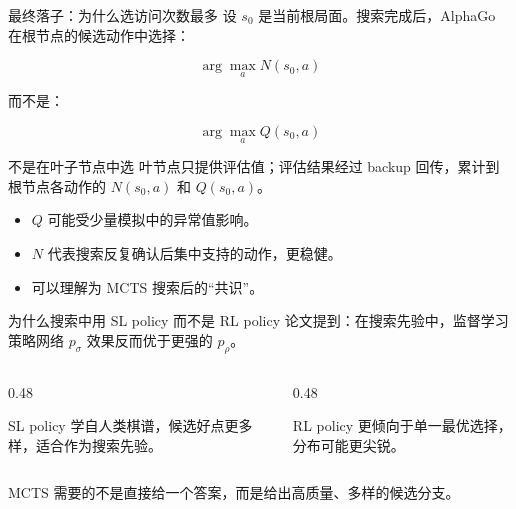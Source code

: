 \documentclass[UTF8,aspectratio=169,10pt]{ctexbeamer}
\begin{document}
\begin{frame}{最终落子：为什么选访问次数最多}
  设 $s_0$ 是当前根局面。搜索完成后，AlphaGo 在根节点的候选动作中选择：

  \[
    \arg\max_a N(s_0,a)
  \]

  而不是：

  \[
    \arg\max_a Q(s_0,a)
  \]

  \begin{block}{不是在叶子节点中选}
    叶节点只提供评估值；评估结果经过 backup 回传，累计到根节点各动作的 $N(s_0,a)$ 和 $Q(s_0,a)$。
  \end{block}

  \begin{itemize}
    \item $Q$ 可能受少量模拟中的异常值影响。
    \item $N$ 代表搜索反复确认后集中支持的动作，更稳健。
    \item 可以理解为 MCTS 搜索后的“共识”。
  \end{itemize}
\end{frame}

\begin{frame}{为什么搜索中用 SL policy 而不是 RL policy}
  论文提到：在搜索先验中，监督学习策略网络 $p_{\sigma}$ 效果反而优于更强的 $p_{\rho}$。

  \begin{columns}[T,onlytextwidth]
    \begin{column}{0.48\textwidth}
      \begin{block}{SL policy}
        学自人类棋谱，候选好点更多样，适合作为搜索先验。
      \end{block}
    \end{column}
    \begin{column}{0.48\textwidth}
      \begin{block}{RL policy}
        更倾向于单一最优选择，分布可能更尖锐。
      \end{block}
    \end{column}
  \end{columns}

  \vspace{0.4cm}
  MCTS 需要的不是直接给一个答案，而是给出高质量、多样的候选分支。
\end{frame}
\end{document}
